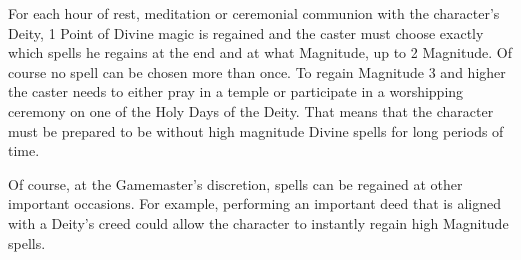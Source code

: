 For each hour of rest, meditation or ceremonial communion with the character’s Deity, 1 Point of Divine magic is regained and the caster must choose exactly which spells he regains at the end and at what Magnitude, up to 2 Magnitude. Of course no spell can be chosen more than once. To regain Magnitude 3 and higher the caster needs to either pray in a temple or participate in a worshipping ceremony on one of the Holy Days of the Deity. That means that the character must be prepared to be without high magnitude Divine spells for long periods of time.

Of course, at the Gamemaster's discretion, spells can be regained at other important occasions. For example, performing an important deed that is aligned with a Deity's creed could allow the character to instantly regain high Magnitude spells.


